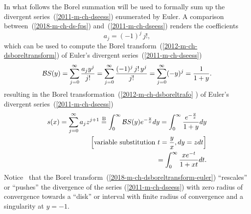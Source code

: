 In what follows the Borel summation will be used to formally sum up
the divergent series~(\ref{2011-m-ch-dseess}) enumerated by Euler.
A comparison
between~(\ref{2018-m-ch-ds-fps})
and~(\ref{2011-m-ch-dseess})
renders the coefficients
\begin{equation}
a_j =  (-1)^j \, j!,
\label{2019-mm-ch-dsboreltransform-euler}
\end{equation}
which can be used to compute the Borel transform~(\ref{2012-m-ch-dsboreltransform}) of Euler's divergent
series~(\ref{2011-m-ch-dseess})
\begin{equation}
{\cal B}S (y)
=
  \sum_{j=0}^\infty   \frac{a_j y^j}{j!}
  =   \sum_{j=0}^\infty   \frac{(-1)^j \, j!\, y^j}{j!}
  =   \sum_{j=0}^\infty    (-y)^j  = \frac{1}{1+y}
.
\label{2018-m-ch-dsboreltransform-euler}
\end{equation}
resulting in the Borel transformation~(\ref{2012-m-ch-dsboreltrafo} ) of Euler's divergent
series~(\ref{2011-m-ch-dseess})
\begin{equation}
\begin{split}
s(x) = \sum_{j=0}^\infty
a_j z^{j+1}
\stackrel{{\rm B}}{=}
\int_0^\infty {\cal B}S (y)  e^{-\frac{y}{x}}   dy
= \int_0^\infty \frac{ e^{-\frac{y}{x}} }{1+y}    dy \\
\left[\textrm{variable substitution } t =  \frac{y}{x} , dy =  z dt \right]\\
= \int_0^\infty \frac{ x e^{-t }}{1+xt}    dt
.
\end{split}
\label{2018-m-ch-dsboreltrafo2-Euler}
\end{equation}
Notice~\cite{rousseau-2004} that the Borel transform~(\ref{2018-m-ch-dsboreltransform-euler})
``rescales'' or
``pushes'' the divergence of the series (\ref{2011-m-ch-dseess}) with zero radius of convergence
towards a ``disk'' or interval with finite radius of convergence and a singularity at $y=-1$.



